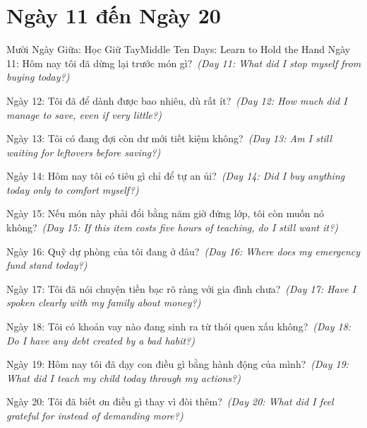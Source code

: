 \section*{Ngày 11 đến Ngày 20}
\begin{truyen}{Mười Ngày Giữa: Học Giữ Tay}{Middle Ten Days: Learn to Hold the Hand}
Ngày 11: Hôm nay tôi đã dừng lại trước món gì?\
\textit{(Day 11: What did I stop myself from buying today?)}

Ngày 12: Tôi đã để dành được bao nhiêu, dù rất ít?\
\textit{(Day 12: How much did I manage to save, even if very little?)}

Ngày 13: Tôi có đang đợi còn dư mới tiết kiệm không?\
\textit{(Day 13: Am I still waiting for leftovers before saving?)}

Ngày 14: Hôm nay tôi có tiêu gì chỉ để tự an ủi?\
\textit{(Day 14: Did I buy anything today only to comfort myself?)}

Ngày 15: Nếu món này phải đổi bằng năm giờ đứng lớp, tôi còn muốn nó không?\
\textit{(Day 15: If this item costs five hours of teaching, do I still want it?)}

Ngày 16: Quỹ dự phòng của tôi đang ở đâu?\
\textit{(Day 16: Where does my emergency fund stand today?)}

Ngày 17: Tôi đã nói chuyện tiền bạc rõ ràng với gia đình chưa?\
\textit{(Day 17: Have I spoken clearly with my family about money?)}

Ngày 18: Tôi có khoản vay nào đang sinh ra từ thói quen xấu không?\
\textit{(Day 18: Do I have any debt created by a bad habit?)}

Ngày 19: Hôm nay tôi đã dạy con điều gì bằng hành động của mình?\
\textit{(Day 19: What did I teach my child today through my actions?)}

Ngày 20: Tôi đã biết ơn điều gì thay vì đòi thêm?\
\textit{(Day 20: What did I feel grateful for instead of demanding more?)}
\end{truyen}

